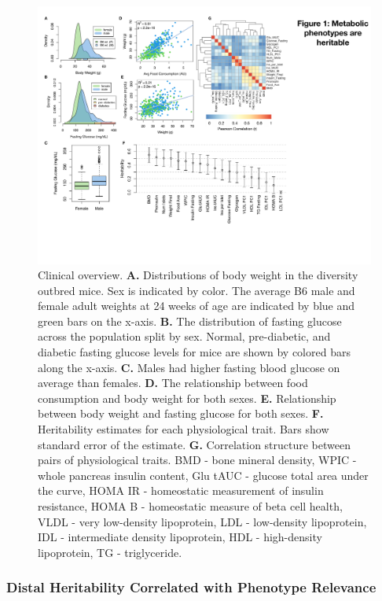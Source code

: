 \documentclass[
]{article}
\begin{document}
\begin{figure}[ht!]
\includegraphics[width=\textwidth]{Figures/Fig1_trait_overview.pdf} 
\caption{Clinical overview. \textbf{A.} Distributions of body weight 
in the diversity outbred mice. Sex is indicated by color. The 
average B6 male and female adult weights at 24 weeks of age 
are indicated by blue and green bars on the x-axis. \textbf{B.} The 
distribution of fasting glucose across the population split 
by sex. Normal, pre-diabetic, and diabetic fasting glucose levels 
for mice are shown by colored bars along the x-axis. \textbf{C.} Males had 
higher fasting blood glucose on average than females. \textbf{D.} The 
relationship between food consumption and body weight for both 
sexes. \textbf{E.} Relationship between body weight and fasting glucose 
for both sexes. \textbf{F.} Heritability estimates for each physiological 
trait. Bars show standard error of the estimate. \textbf{G.} Correlation 
structure between pairs of physiological traits. BMD - bone mineral density,
WPIC - whole pancreas insulin content, Glu tAUC - glucose total area under 
the curve, HOMA IR - homeostatic measurement of insulin resistance, HOMA B - 
homeostatic measure of beta cell health, VLDL - very low-density lipoprotein,
LDL - low-density lipoprotein, IDL - intermediate density lipoprotein, 
HDL - high-density lipoprotein, TG - triglyceride.
}
\label{fig:trait_overview}
\end{figure}

\subsubsection{Distal Heritability Correlated with Phenotype
Relevance}\label{distal-heritability-correlated-with-phenotype-relevance}
\end{document}
